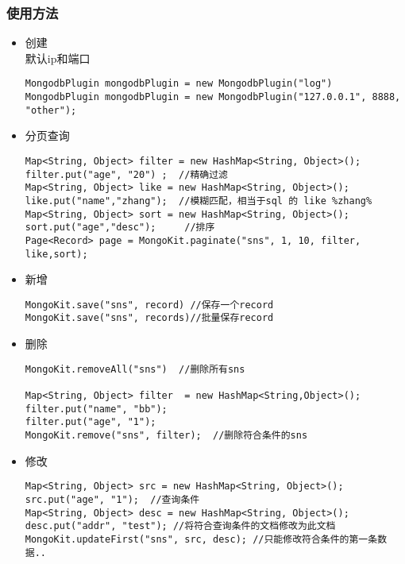 \documentclass{scrartcl}
\begin{document}
\subsubsection{使用方法}
\label{sec-2-6-2}
\begin{itemize}

\item 创建\\
\label{sec-2-6-2-1}%
默认ip和端口

\begin{verbatim}
MongodbPlugin mongodbPlugin = new MongodbPlugin("log")
MongodbPlugin mongodbPlugin = new MongodbPlugin("127.0.0.1", 8888, "other");
\end{verbatim}


\item 分页查询\\
\label{sec-2-6-2-2}%
\begin{verbatim}
Map<String, Object> filter = new HashMap<String, Object>();
filter.put("age", "20") ;  //精确过滤
Map<String, Object> like = new HashMap<String, Object>();
like.put("name","zhang");  //模糊匹配，相当于sql 的 like %zhang%
Map<String, Object> sort = new HashMap<String, Object>();
sort.put("age","desc");     //排序
Page<Record> page = MongoKit.paginate("sns", 1, 10, filter, like,sort);
\end{verbatim}

\item 新增\\
\label{sec-2-6-2-3}%
\begin{verbatim}
MongoKit.save("sns", record) //保存一个record
MongoKit.save("sns", records)//批量保存record
\end{verbatim}


\item 删除\\
\label{sec-2-6-2-4}%
\begin{verbatim}
MongoKit.removeAll("sns")  //删除所有sns

Map<String, Object> filter  = new HashMap<String,Object>();
filter.put("name", "bb");
filter.put("age", "1");
MongoKit.remove("sns", filter);  //删除符合条件的sns
\end{verbatim}

\item 修改\\
\label{sec-2-6-2-5}%
\begin{verbatim}
Map<String, Object> src = new HashMap<String, Object>();
src.put("age", "1");  //查询条件
Map<String, Object> desc = new HashMap<String, Object>();
desc.put("addr", "test"); //将符合查询条件的文档修改为此文档
MongoKit.updateFirst("sns", src, desc); //只能修改符合条件的第一条数据..
\end{verbatim}
\end{itemize} %
\end{document}
